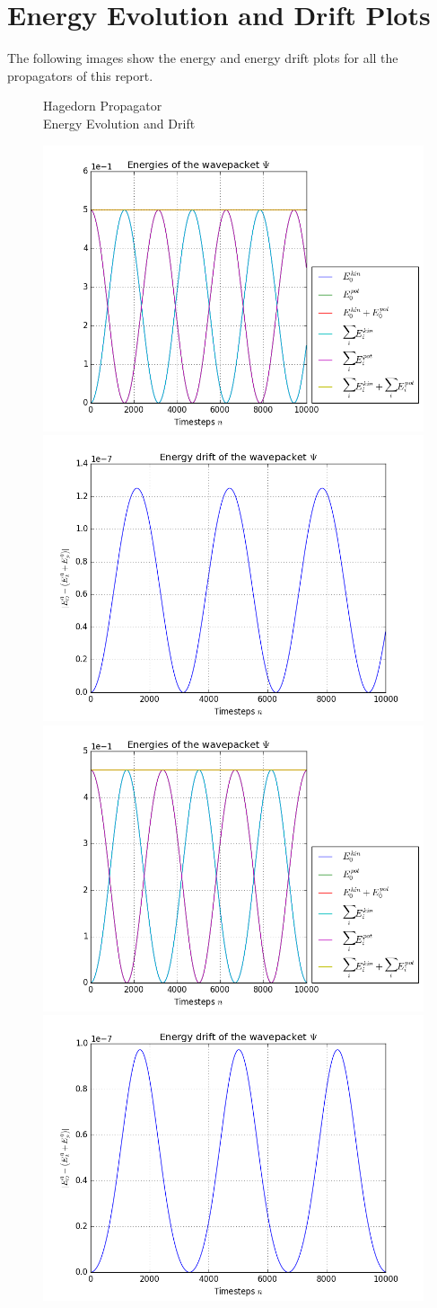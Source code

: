 \appendix

\section{Energy Evolution and Drift Plots}
%
The following images show the energy and energy drift plots for all the propagators of this report.

\begin{figure}[ht]
	\centering
	\begin{minipage}[c]{\textwidth}
		\begin{center}
			\large Hagedorn Propagator \\[1mm]
			\normalsize Energy Evolution and Drift
			\vspace{4mm}
		\end{center}
	\end{minipage}
	\includegraphics[width=.45\textwidth]{figures/harmonic_1D_Hagedorn_energies.png}
	\includegraphics[width=.45\textwidth]{figures/harmonic_1D_Hagedorn_drift.png} \\
	\includegraphics[width=.45\textwidth]{figures/torsional_1D_Hagedorn_energies.png}
	\includegraphics[width=.45\textwidth]{figures/torsional_1D_Hagedorn_drift.png} \\

\end{figure}
